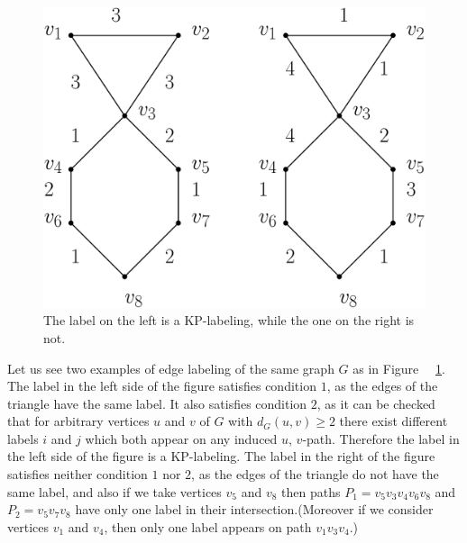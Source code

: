 \documentclass[12pt,a4paper,titlepage,openany]{report}
\begin{document}
\begin{figure}[h!]
\begin{center}
\includegraphics[width=1\linewidth]{figures/kpexample.png}
\end{center}
\caption{The label on the left is a KP-labeling, while the one on the right is not.}\label{kpexample}
\end{figure}
\begin{example}
Let us see two examples of edge labeling of the same graph $G$ as in Figure ~~\ref{kpexample}.\newline
The label in the left side of the figure satisfies condition $1$, as the edges of the triangle have the same label. It also satisfies condition $2$, as it can be checked that for arbitrary vertices $u$ and $v$ of $G$ with $d_G(u,v) \geq 2$ there exist different labels $i$ and $j$ which both appear on any induced $u$, $v$-path. Therefore the label in the left side of the figure is a KP-labeling.\newline
The label in the right of the figure satisfies neither condition $1$ nor $2$, as the edges of the triangle do not have the same label, and also if we take vertices $v_5$ and $v_8$ then paths $P_1=v_5v_3v_4v_6v_8$ and $P_2=v_5v_7v_8$ have only one label in their intersection.(Moreover if we consider vertices $v_1$ and $v_4$, then only one label appears on path $v_1v_3v_4$.)
\end{example}
\end{document}
